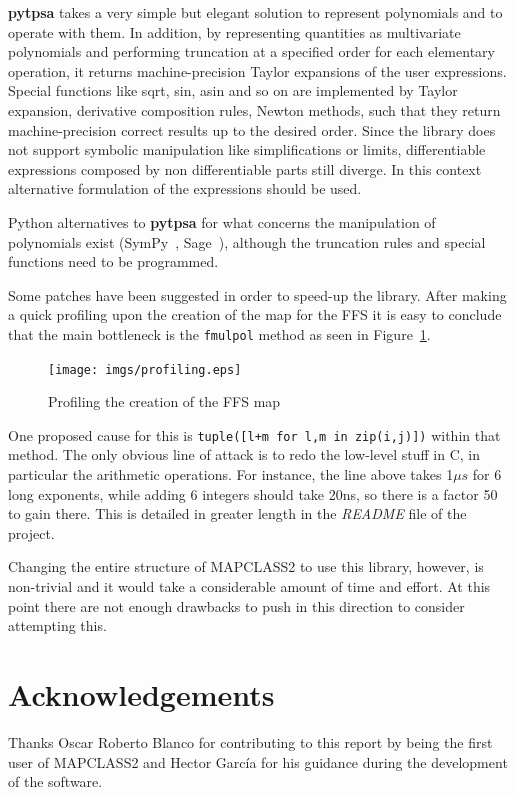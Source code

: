 \documentclass[a4paper]{cernatsnote}
\begin{document}
\textbf{pytpsa} takes a very simple but elegant solution to represent
polynomials and to operate with them. In addition, by representing quantities
as multivariate polynomials and performing truncation at a specified order
for each elementary operation, it returns machine-precision Taylor expansions
of the user expressions. Special functions like sqrt, sin, asin and so on
are implemented by Taylor expansion, derivative composition rules, Newton
methods, such that they return machine-precision correct results up to the
desired order. Since the library does not support symbolic manipulation like
simplifications or limits, differentiable expressions composed by non
differentiable parts still diverge. In this context alternative formulation of
the expressions should be used.

Python alternatives to \textbf{pytpsa} for what concerns the manipulation of
polynomials exist (SymPy~\cite{sympy}, Sage~\cite{sagemath}), although the
truncation rules and special functions need to be programmed.

Some patches have been suggested in order to speed-up the library.  After
making a quick profiling upon the creation of the map for the FFS it is easy
to conclude that the main bottleneck is the \texttt{fmulpol} method as seen in
Figure~\ref{profiling}.

\begin{figure}[!hbt]
  \centering
  \texttt{[image: imgs/profiling.eps]}
  \caption{Profiling the creation of the FFS map}
  \label{profiling}
\end{figure}

One proposed cause for this is \texttt{tuple([l+m for l,m in zip(i,j)])}
within that method. The only obvious line of attack is to redo the low-level
stuff in C, in particular the arithmetic operations. For instance, the line
above takes 1$\mu s$ for 6 long exponents, while adding 6 integers should take
20ns, so there is a factor 50 to gain there. This is detailed in greater
length in the \textit{README} file of the project.

Changing the entire structure of \textsc{MAPCLASS2} to use this library,
however, is non-trivial and it would take a considerable amount of time and
effort. At this point there are not enough drawbacks to push in this direction
to consider attempting this.

\section*{Acknowledgements}
Thanks Oscar Roberto Blanco for contributing to this report by being
the first user of \textsc{MAPCLASS2} and Hector Garc\'ia for his
guidance during the development of the software.
\end{document}
